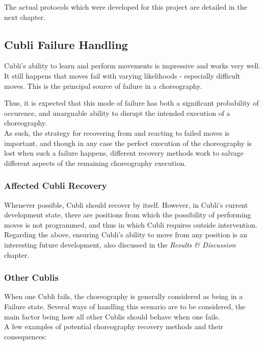 The actual protocols which were developed for this project are detailed in the next chapter.

\subsection{Cubli Failure Handling}

Cubli's ability to learn and perform movements is impressive and works very well. It still happens that moves fail with varying likelihoods - especially difficult moves. This is the principal source of failure in a choreography.

Thus, it is expected that this mode of failure has both a significant probability of occurence, and unarguable ability to disrupt the intended execution of a choreography.\\

As such, the strategy for recovering from and reacting to failed moves is important, and though in any case the perfect execution of the choreography is lost when such a failure happens, different recovery methods work to salvage different aspects of the remaining choreography execution.

\subsubsection{Affected Cubli Recovery}

Whenever possible, Cubli should recover by itself. However, in Cubli's current development state, there are positions from which the possibility of performing moves is not programmed, and thus in which Cubli requires outside intervention.\\

Regarding the above, ensuring Cubli's ability to move from any position is an interesting future development, also discussed in the \textit{Results \& Discussion} chapter.



\subsubsection{Other Cublis}

When one Cubli fails, the choreography is generally considered as being in a Failure state. Several ways of handling this scenario are to be considered, the main factor being how all other Cublis should behave when one fails.\\

A few examples of potential choreography recovery methods and their consequences:\\

